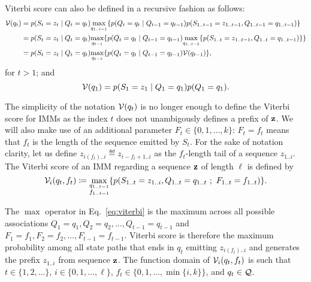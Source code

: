 Viterbi score can also be defined in a recursive fashion as follows:
\begin{equation*}
\begin{split}
  \mathcal{V}(q_t)
  &= p(S_t=z_t \;|\; Q_t=q_t) \underset{q_{1..t-1}}{\max}
    \{ p(Q_t=q_t \;|\; Q_{t-1}=q_{t-1}) p(S_{1..t-1}=z_{1..t-1}, Q_{1..t-1}=q_{1..t-1}) \} \\
  &= p(S_t=z_t \;|\; Q_t=q_t) \underset{q_{t-1}}{\max}
    \{ p(Q_t=q_t \;|\; Q_{t-1}=q_{t-1})
    \underset{q_{1..t-2}}{\max} \{ p(S_{1..t}=z_{1..t-1}, Q_{1..t}=q_{1..t-1}) \} \} \\
  &= p(S_t=z_t \;|\; Q_t=q_t) \underset{q_{t-1}}{\max} \{ p(Q_t=q_t \;|\; Q_{t-1}=q_{t-1})
    \mathcal{V}(q_{t-1}) \},
\end{split}
\end{equation*}
for $t>1$; and
\begin{equation*}
  \mathcal{V}(q_1) = p(S_1=z_1 \;|\; Q_1=q_1) p(Q_1=q_1).
\end{equation*}



The simplicity of the notation $\mathcal{V}(q_t)$ is no longer enough to define the Viterbi score for
IMMs as the index $t$ does not unambigously defines a prefix of $\mathbf{z}$. We will also make use of
an additional parameter $F_t\in \{0, 1, \dots, k\}$: $F_t=f_t$ means that $f_t$ is the length of the
sequence emitted by $S_t$.
For the sake of notation clarity, let us define $z_{i(f_t)..i} \eqdef
z_{i-f_t+1..i}$ as the $f_t$-length tail of a sequence $z_{1..i}$. The Viterbi score of an IMM
regarding a sequence $\mathbf{z}$ of length $\ell$ is defined by
\begin{equation}\label{eq:viterbi}
  \mathcal{V}_{i}(q_t,f_t) \coloneqq
    \underset{\substack{q_{1..t-1}\\f_{1..t-1}}}{\max}
    \{
      p(S_{1..t}=z_{1..i}, Q_{1..t}=q_{1..t} ~;~ F_{1..t}=f_{1..t})
    \}.
\end{equation}

The $\max$ operator in Eq.~\eqref{eq:viterbi} is the maximum across all possible associations
$Q_1=q_1, Q_2=q_2, \dots, Q_{t-1}=q_{t-1}$ and $F_1=f_1, F_2=f_2, \dots, F_{t-1}=f_{t-1}$. Viterbi
score is therefore the maximum probability among all state paths that ends in $q_t$ emitting
$z_{i(f_t)..i}$ and generates the prefix $z_{1..i}$ from sequence $\mathbf{z}$. The function domain of
$\mathcal{V}_{i}(q_t,f_t)$ is such that $t \in \{1, 2, \dots\}$, $i \in \{0, 1, \dots, \ell\}$, $f_t
\in \{0, 1, \dots, \min\{i, k\}\}$, and $q_t \in \mathcal{Q}$.

